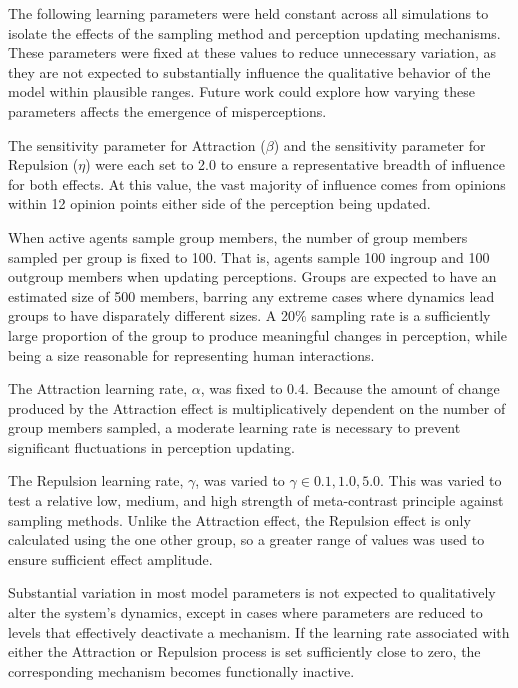 The following learning parameters were held constant across all simulations to isolate the effects of the sampling method and perception updating mechanisms. These parameters were fixed at these values to reduce unnecessary variation, as they are not expected to substantially influence the qualitative behavior of the model within plausible ranges. Future work could explore how varying these parameters affects the emergence of misperceptions. 

The sensitivity parameter for Attraction ($\beta$) and the sensitivity parameter for Repulsion ($\eta$) were each set to 2.0 to ensure a representative breadth of influence for both effects. At this value, the vast majority of influence comes from opinions within 12 opinion points either side of the perception being updated. 


When active agents sample group members, the number of group members sampled per group is fixed to 100. That is, agents sample 100 ingroup and 100 outgroup members when updating perceptions. Groups are expected to have an estimated size of 500 members, barring any extreme cases where dynamics lead groups to have disparately different sizes. A 20\% sampling rate is a sufficiently large proportion of the group to produce meaningful changes in perception, while being a size reasonable for representing human interactions. 

The Attraction learning rate, $\alpha$, was fixed to 0.4. Because the amount of change produced by the Attraction effect is multiplicatively dependent on the number of group members sampled, a moderate learning rate is necessary to prevent significant fluctuations in perception updating. 

The Repulsion learning rate, $\gamma$, was varied to $\gamma \in {0.1, 1.0, 5.0}$. This was varied to test a relative low, medium, and high strength of meta-contrast principle against sampling methods. Unlike the Attraction effect, the Repulsion effect is only calculated using the one other group, so a greater range of values was used to ensure sufficient effect amplitude. 

Substantial variation in most model parameters is not expected to qualitatively alter the system's dynamics, except in cases where parameters are reduced to levels that effectively deactivate a mechanism. If the learning rate associated with either the Attraction or Repulsion process is set sufficiently close to zero, the corresponding mechanism becomes functionally inactive.

